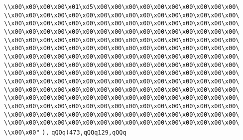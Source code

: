 \verb|\\x00\x00\x00\x00\x01\xd5\x00\x00\x00\x00\x00\x00\x00\x00\x00\x00\|\newline
\verb|\\x00\x00\x00\x00\x00\x00\x00\x00\x00\x00\x00\x00\x00\x00\x00\x00\|\newline
\verb|\\x00\x00\x00\x00\x00\x00\x00\x00\x00\x00\x00\x00\x00\x00\x00\x00\|\newline
\verb|\\x00\x00\x00\x00\x00\x00\x00\x00\x00\x00\x00\x00\x00\x00\x00\x00\|\newline
\verb|\\x00\x00\x00\x00\x00\x00\x00\x00\x00\x00\x00\x00\x00\x00\x00\x00\|\newline
\verb|\\x00\x00\x00\x00\x00\x00\x00\x00\x00\x00\x00\x00\x00\x00\x00\x00\|\newline
\verb|\\x00\x00\x00\x00\x00\x00\x00\x00\x00\x00\x00\x00\x00\x00\x00\x00\|\newline
\verb|\\x00\x00\x00\x00\x00\x00\x00\x00\x00\x00\x00\x00\x00\x00\x00\x00\|\newline
\verb|\\x00\x00\x00\x00\x00\x00\x00\x00\x00\x00\x00\x00\x00\x00\x00\x00\|\newline
\verb|\\x00\x00\x00\x00\x00\x00\x00\x00\x00\x00\x00\x00\x00\x00\x00\x00\|\newline
\verb|\\x00\x00\x00\x00\x00\x00\x00\x00\x00\x00\x00\x00\x00\x00\x00\x00\|\newline
\verb|\\x00\x00\x00\x00\x00\x00\x00\x00\x00\x00\x00\x00\x00\x00\x00\x00\|\newline
\verb|\\x00\x00\x00\x00\x00\x00\x00\x00\x00\x00\x00\x00\x00\x00\x00\x00\|\newline
\verb|\\x00\x00\x00\x00\x00\x00\x00\x00\x00\x00\x00\x00\x00\x00\x00\x00\|\newline
\verb|\\x00\x00\x00\x00\x00\x00\x00\x00\x00\x00\x00\x00\x00\x00\x00\x00\|\newline
\verb|\\x00\x00"|\newline
\verb|),|\newline
\verb|qQQq(473,qQQq129,qQQq|\newline
